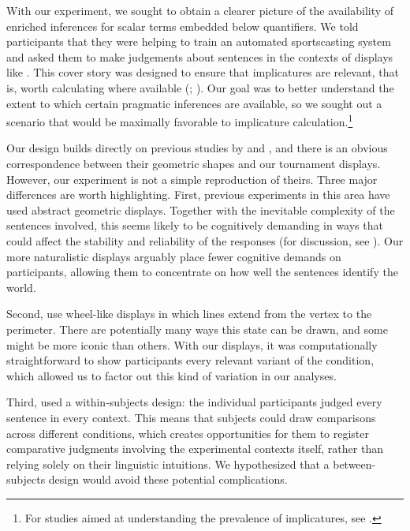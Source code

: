 \documentclass[leqno,12pt]{article}
\begin{document}

With our experiment, we sought to obtain a clearer picture of the
availability of enriched inferences for scalar terms embedded below
quantifiers. We told participants that they were helping to train an 
automated sportscasting system and
asked them to make judgements about sentences
in the contexts of displays like .  This cover story
was designed to ensure that implicatures are relevant,
that is, worth calculating where available
(;
\citealt{Clifton:Dube:2010}). Our goal was to better understand the extent to
which certain pragmatic inferences are available, so we sought
out a scenario that would be maximally favorable to implicature
calculation.\footnote{For studies aimed at understanding the prevalence of
implicatures, see \citealt{Paris:1973,Hendriks-etal:2009}.}

Our design builds directly on previous studies by
\citet{Geurts:Pouscoulous:2009} and \citet{Chemla:Spector:2011}, and 
there is an obvious correspondence between their geometric shapes and
our tournament displays. However, our experiment is not a simple
reproduction of theirs. Three major differences are worth
highlighting. First, previous experiments in this area have used
abstract geometric displays. Together with the inevitable complexity
of the sentences involved, this seems likely to be cognitively
demanding in ways that could affect the stability and reliability of
the responses (for discussion, see \citealt{Clifton:Dube:2010}). Our
more naturalistic displays arguably place fewer cognitive demands on
participants, allowing them to concentrate on how well the sentences
identify the world. 

Second, \citeauthor{Chemla:Spector:2011} use
wheel-like displays in which lines extend from the vertex to the
perimeter. There are potentially many ways this state can be drawn,
and some might be more iconic than others. With our displays, it was
computationally straightforward to show participants every relevant
variant of the condition, which allowed us to factor out this kind of
variation in our analyses. 

Third, \citeauthor{Chemla:Spector:2011}
used a within-subjects design: the individual participants judged
every sentence in every context. This means that subjects could draw
comparisons across different conditions, which creates opportunities
for them to register comparative judgments involving the experimental
contexts itself, rather than relying solely on their linguistic
intuitions. We hypothesized that a between-subjects design would avoid
these potential complications.
\end{document}
